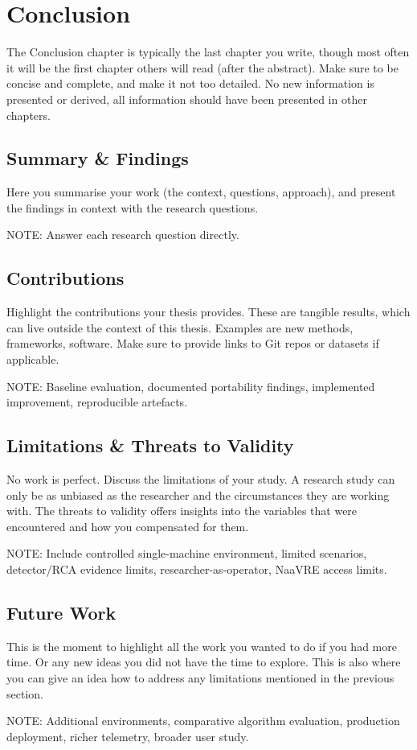 \chapter{Conclusion}%
\label{ch:conclusion}

The Conclusion chapter is typically the last chapter you write, though most often it will be the first chapter others will read (after the abstract).
Make sure to be concise and complete, and make it not too detailed.
No new information is presented or derived, all information should have been presented in other chapters.

\section{Summary \& Findings}
Here you summarise your work (the context, questions, approach), and present the findings in context with the research questions.

NOTE: Answer each research question directly.

\section{Contributions}
Highlight the contributions your thesis provides.
These are tangible results, which can live outside the context of this thesis.
Examples are new methods, frameworks, software.
Make sure to provide links to Git repos or datasets if applicable.

NOTE: Baseline evaluation, documented portability findings, implemented improvement, reproducible artefacts.

\section{Limitations \& Threats to Validity}
No work is perfect.
Discuss the limitations of your study.
A research study can only be as unbiased as the researcher and the circumstances they are working with.
The threats to validity offers insights into the variables that were encountered and how you compensated for them.

NOTE: Include controlled single-machine environment, limited scenarios, detector/RCA evidence limits, researcher-as-operator, NaaVRE access limits.


\section{Future Work}
This is the moment to highlight all the work you wanted to do if you had more time.
Or any new ideas you did not have the time to explore.
This is also where you can give an idea how to address any limitations mentioned in the previous section.

NOTE: Additional environments, comparative algorithm evaluation, production deployment, richer telemetry, broader user study.
